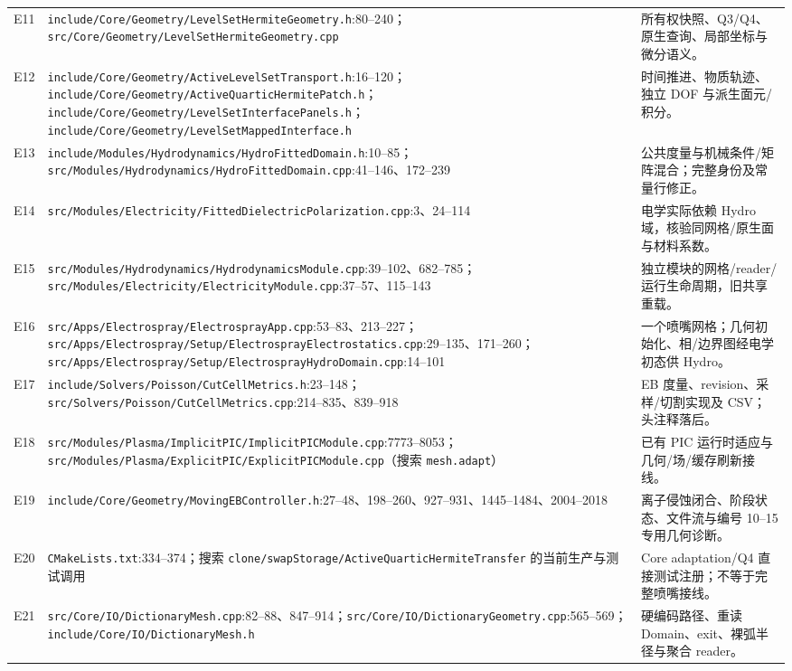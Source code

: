 \documentclass[UTF8,a4paper,11pt,fontset=fandol]{ctexart}
\newcommand{\code}[1]{\nolinkurl{#1}}
\begin{document}
\begin{longtable}{@{}P{.07\textwidth}P{.58\textwidth}P{.29\textwidth}@{}}
E11 & \code{include/Core/Geometry/LevelSetHermiteGeometry.h}:80--240；\code{src/Core/Geometry/LevelSetHermiteGeometry.cpp} & 所有权快照、Q3/Q4、原生查询、局部坐标与微分语义。\\
E12 & \code{include/Core/Geometry/ActiveLevelSetTransport.h}:16--120；\code{include/Core/Geometry/ActiveQuarticHermitePatch.h}；\code{include/Core/Geometry/LevelSetInterfacePanels.h}；\code{include/Core/Geometry/LevelSetMappedInterface.h} & 时间推进、物质轨迹、独立 DOF 与派生面元/积分。\\
E13 & \code{include/Modules/Hydrodynamics/HydroFittedDomain.h}:10--85；\code{src/Modules/Hydrodynamics/HydroFittedDomain.cpp}:41--146、172--239 & 公共度量与机械条件/矩阵混合；完整身份及常量行修正。\\
E14 & \code{src/Modules/Electricity/FittedDielectricPolarization.cpp}:3、24--114 & 电学实际依赖 Hydro 域，核验同网格/原生面与材料系数。\\
E15 & \code{src/Modules/Hydrodynamics/HydrodynamicsModule.cpp}:39--102、682--785；\code{src/Modules/Electricity/ElectricityModule.cpp}:37--57、115--143 & 独立模块的网格/reader/运行生命周期，旧共享重载。\\
E16 & \code{src/Apps/Electrospray/ElectrosprayApp.cpp}:53--83、213--227；\code{src/Apps/Electrospray/Setup/ElectrosprayElectrostatics.cpp}:29--135、171--260；\code{src/Apps/Electrospray/Setup/ElectrosprayHydroDomain.cpp}:14--101 & 一个喷嘴网格；几何初始化、相/边界图经电学初态供 Hydro。\\
E17 & \code{include/Solvers/Poisson/CutCellMetrics.h}:23--148；\code{src/Solvers/Poisson/CutCellMetrics.cpp}:214--835、839--918 & EB 度量、revision、采样/切割实现及 CSV；头注释落后。\\
E18 & \code{src/Modules/Plasma/ImplicitPIC/ImplicitPICModule.cpp}:7773--8053；\code{src/Modules/Plasma/ExplicitPIC/ExplicitPICModule.cpp}（搜索 \code{mesh.adapt}） & 已有 PIC 运行时适应与几何/场/缓存刷新接线。\\
E19 & \code{include/Core/Geometry/MovingEBController.h}:27--48、198--260、927--931、1445--1484、2004--2018 & 离子侵蚀闭合、阶段状态、文件流与编号 10--15 专用几何诊断。\\
E20 & \code{CMakeLists.txt}:334--374；搜索 \code{clone/swapStorage/ActiveQuarticHermiteTransfer} 的当前生产与测试调用 & Core adaptation/Q4 直接测试注册；不等于完整喷嘴接线。\\
E21 & \code{src/Core/IO/DictionaryMesh.cpp}:82--88、847--914；\code{src/Core/IO/DictionaryGeometry.cpp}:565--569；\code{include/Core/IO/DictionaryMesh.h} & 硬编码路径、重读 Domain、exit、裸弧半径与聚合 reader。\\

\end{longtable}
\end{document}

